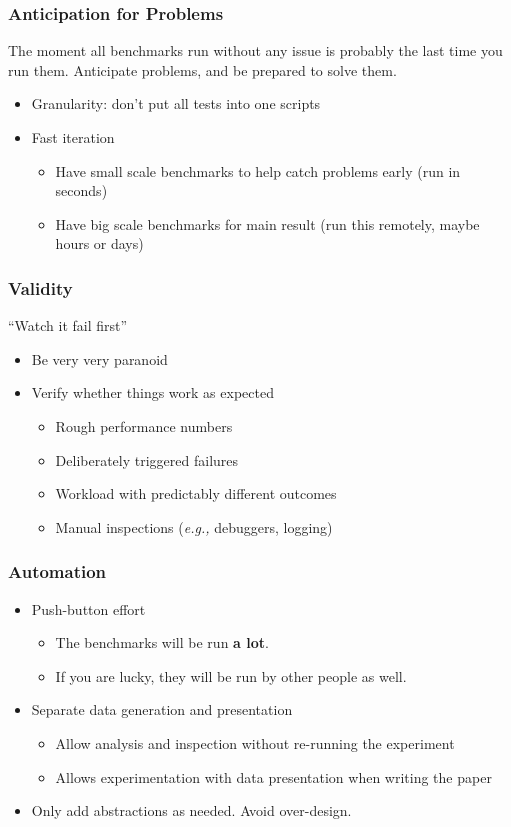 \documentclass[xcolor={dvipsnames},aspectratio=149]{beamer}
\def\eg{\emph{e.g.,}\xspace}
\begin{document}
\begin{frame}
  \frametitle{Anticipation for Problems}
  The moment all benchmarks run without any issue is probably the last time you run them.
  Anticipate problems, and be prepared to solve them.
  \begin{itemize}
  \item Granularity: don't put all tests into one scripts
  \item Fast iteration
    \begin{itemize}
    \item Have small scale benchmarks to help catch problems early (run in seconds)
    \item Have big scale benchmarks for main result (run this remotely, maybe hours or days)
    \end{itemize}
  \end{itemize}
\end{frame}

\begin{frame}
  \frametitle{Validity}
  ``Watch it fail first''
  \begin{itemize}
  \item Be very very paranoid
  \item Verify whether things work as expected
    \begin{itemize}
    \item Rough performance numbers
    \item Deliberately triggered failures
    \item Workload with predictably different outcomes
    \item Manual inspections (\eg debuggers, logging)
    \end{itemize}
  \end{itemize}
\end{frame}

\begin{frame}
  \frametitle{Automation}
  \begin{itemize}
  \item Push-button effort
    \begin{itemize}
    \item The benchmarks will be run \textbf{a lot}.
    \item If you are lucky, they will be run by other people as well.
    \end{itemize}
  \item Separate data generation and presentation
    \begin{itemize}
    \item Allow analysis and inspection without re-running the experiment
    \item Allows experimentation with data presentation when writing the paper
    \end{itemize}
  \item Only add abstractions as needed. Avoid over-design.
  \end{itemize}
\end{frame}
\end{document}

